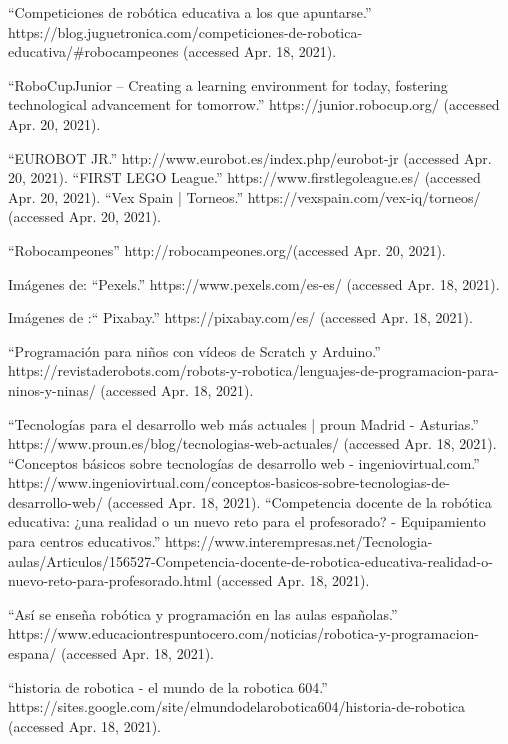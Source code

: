 \begin{thebibliography}{69}
	“Competiciones de robótica educativa a los que apuntarse.” https://blog.juguetronica.com/competiciones-de-robotica-educativa/\#robocampeones (accessed Apr. 18, 2021).

 “RoboCupJunior – Creating a learning environment for today, fostering technological advancement for tomorrow.” https://junior.robocup.org/ (accessed Apr. 20, 2021).

	“EUROBOT JR.” http://www.eurobot.es/index.php/eurobot-jr (accessed Apr. 20, 2021).
 “FIRST LEGO League.” https://www.firstlegoleague.es/ (accessed Apr. 20, 2021).
 “Vex Spain | Torneos.” https://vexspain.com/vex-iq/torneos/ (accessed Apr. 20, 2021).

 “Robocampeones”
http://robocampeones.org/(accessed Apr. 20, 2021).

 Imágenes de:	“Pexels.” https://www.pexels.com/es-es/ (accessed Apr. 18, 2021).

 Imágenes de :“ Pixabay.” https://pixabay.com/es/ (accessed Apr. 18, 2021).

\bibitem{}	“Programación para niños con vídeos de Scratch y Arduino.” https://revistaderobots.com/robots-y-robotica/lenguajes-de-programacion-para-ninos-y-ninas/ (accessed Apr. 18, 2021).

\bibitem{}	“Tecnologías para el desarrollo web más actuales | proun Madrid - Asturias.” https://www.proun.es/blog/tecnologias-web-actuales/ (accessed Apr. 18, 2021).
\bibitem{}	“Conceptos básicos sobre tecnologías de desarrollo web - ingeniovirtual.com.” https://www.ingeniovirtual.com/conceptos-basicos-sobre-tecnologias-de-desarrollo-web/ (accessed Apr. 18, 2021).
\bibitem{} “Competencia docente de la robótica educativa: ¿una realidad o un nuevo reto para el profesorado? - Equipamiento para centros educativos.” https://www.interempresas.net/Tecnologia-aulas/Articulos/156527-Competencia-docente-de-robotica-educativa-realidad-o-nuevo-reto-para-profesorado.html (accessed Apr. 18, 2021).



\bibitem{}	“Así se enseña robótica y programación en las aulas españolas.” https://www.educaciontrespuntocero.com/noticias/robotica-y-programacion-espana/ (accessed Apr. 18, 2021).

 “historia de robotica - el mundo de la robotica 604.” https://sites.google.com/site/elmundodelarobotica604/historia-de-robotica (accessed Apr. 18, 2021).


\end{thebibliography}
